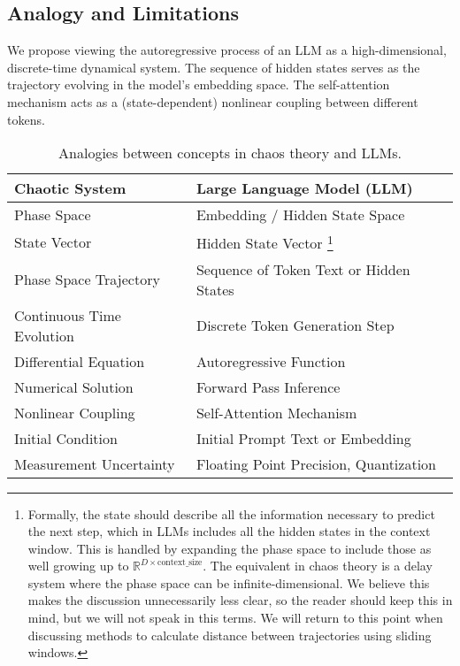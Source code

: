 \documentclass[a4paper,12pt]{article}
\begin{document}
\subsection{Analogy and Limitations}
We propose viewing the autoregressive process of an LLM as a high-dimensional, discrete-time dynamical system. The sequence of hidden states serves as the trajectory evolving in the model's embedding space. The self-attention mechanism acts as a (state-dependent) nonlinear coupling between different tokens. 

\begin{table}[H]
\centering
\begin{tabular}{@{}ll@{}}
\toprule
\textbf{Chaotic System} & \textbf{Large Language Model (LLM)} \\ \midrule
Phase Space & Embedding / Hidden State Space \\
State Vector & Hidden State Vector \footnote{Formally, the state should describe all the information necessary to predict the next step, which in LLMs includes all the hidden states in the context window. This is handled by expanding the phase space to include those as well growing up to $\mathbb{R}^{D \times \text{context\_size}}$. The equivalent in chaos theory is a delay system where the phase space can be infinite-dimensional. We believe this makes the discussion unnecessarily less clear, so the reader should keep this in mind, but we will not speak in this terms. We will return to this point when discussing methods to calculate distance between trajectories using sliding windows.} \\ %
Phase Space Trajectory & Sequence of Token Text or Hidden States \\
Continuous Time Evolution & Discrete Token Generation Step \\
Differential Equation & Autoregressive Function \\
Numerical Solution & Forward Pass Inference \\
Nonlinear Coupling & Self-Attention Mechanism \\
Initial Condition & Initial Prompt Text or Embedding \\
Measurement Uncertainty & Floating Point Precision, Quantization \\ \bottomrule
\end{tabular}
\caption{Analogies between concepts in chaos theory and LLMs.}
\label{tab:analogy}
\end{table}
\end{document}

